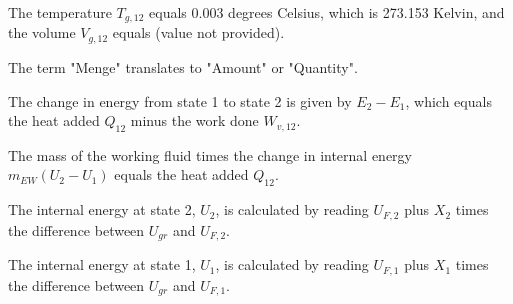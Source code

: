 The temperature \( T_{g,12} \) equals 0.003 degrees Celsius, which is 273.153 Kelvin, and the volume \( V_{g,12} \) equals (value not provided).

The term "Menge" translates to "Amount" or "Quantity".

The change in energy from state 1 to state 2 is given by \( E_2 - E_1 \), which equals the heat added \( Q_{12} \) minus the work done \( W_{v,12} \).

The mass of the working fluid times the change in internal energy \( m_{EW} (U_2 - U_1) \) equals the heat added \( Q_{12} \).

The internal energy at state 2, \( U_2 \), is calculated by reading \( U_{F,2} \) plus \( X_2 \) times the difference between \( U_{gr} \) and \( U_{F,2} \).

The internal energy at state 1, \( U_1 \), is calculated by reading \( U_{F,1} \) plus \( X_1 \) times the difference between \( U_{gr} \) and \( U_{F,1} \).